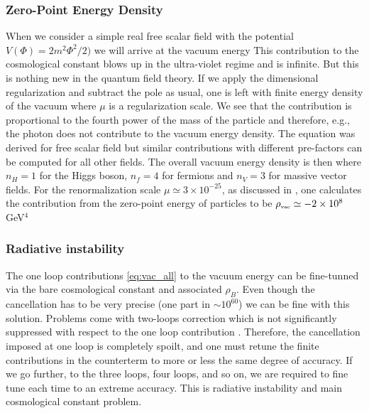 \subsubsection{Zero-Point Energy Density}
When we consider a simple real free scalar field with the potential $V(\Phi)=2m^2\Phi^2/2)$ we will arrive at the vacuum energy
This contribution to the cosmological constant blows up in the ultra-violet regime and is infinite. But this is nothing new in the quantum field theory. If we apply the dimensional regularization \parencite{tHooft:1972tcz} and subtract the pole as usual, one is left with finite energy density of the vacuum
where $\mu$ is a regularization scale. We see that the contribution is proportional to the fourth power of the mass of the particle and therefore, e.g., the photon does not contribute to the vacuum energy density. The equation was derived for free scalar field but similar contributions with different pre-factors can be computed for all other fields. The overall vacuum energy density is then
where $n_H=1$ for the Higgs boson, $n_f=4$ for fermions and $n_V=3$ for massive vector fields. For the renormalization scale $\mu\simeq3\times10^{-25}$, as discussed in \textcite{2011arXiv1105.6296K}, one calculates the contribution from the zero-point energy of particles to be  $\rho_\text{\tiny vac}\simeq-2\times10^8$ GeV$^4$
\subsubsection{Radiative instability}
The one loop contributions \eqref{eq:vac_all} to the vacuum energy can be fine-tunned via the bare cosmological constant and associated $\rho_B$. Even though the cancellation has to be very precise (one part in $\sim10^{60}$) we can be fine with this solution. Problems come with two-loops correction which is not significantly suppressed with respect to the one loop contribution \parencite{2012CRPhy..13..566M}. Therefore, the cancellation imposed at one loop is completely spoilt, and one must retune the finite contributions in the counterterm to more or less the same degree of accuracy. If we go further, to the three loops, four loops, and so on, we are required to fine tune each time to an extreme accuracy. This is radiative instability and main cosmological constant problem.

